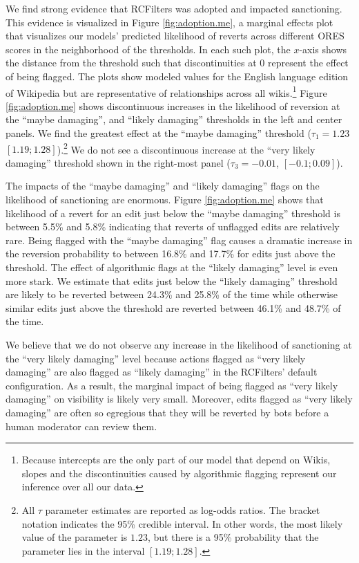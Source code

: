 \documentclass[format=acmsmall, natbib=true,  screen=true]{acmart}
\begin{document}
We find strong evidence that RCFilters was adopted and impacted sanctioning. This evidence is visualized in Figure \ref{fig:adoption.me}, a marginal effects plot that visualizes our models' predicted likelihood of reverts across different ORES scores in the neighborhood of the thresholds. In each such plot, the $x$-axis shows the distance from the threshold such that discontinuities at 0 represent the effect of being flagged. The plots show modeled values for the English language edition of Wikipedia but are representative of relationships across all wikis.\footnote{Because intercepts are the only part of our model that depend on Wikis, slopes and the discontinuities caused by algorithmic flagging represent our inference over all our data.}
Figure \ref{fig:adoption.me} shows discontinuous increases in the likelihood of reversion at the ``maybe damaging'', and ``likely damaging'' thresholds in the left and center panels. 
We find the greatest effect at the ``maybe damaging'' threshold  ($\tau_1 = 1.23$ $[1.19;\allowbreak 1.28]$).\footnote{All $\tau$ parameter estimates are reported as log-odds ratios. The bracket notation indicates the 95\% credible interval.  In other words, the most likely value of the parameter is $1.23$, but there is a 95\% probability that the parameter lies in the interval $[1.19;\allowbreak 1.28]$.}
We do not see a discontinuous increase at the ``very likely damaging'' threshold shown in the right-most panel  ($\tau_3 = -0.01$,  $[-0.1;\allowbreak 0.09]$). 


The impacts of the ``maybe damaging'' and ``likely damaging'' flags on the likelihood of sanctioning are enormous. Figure \ref{fig:adoption.me} shows that likelihood of a revert for an edit just below the ``maybe damaging'' threshold is between 5.5\% and 5.8\% indicating that reverts of unflagged edits are relatively rare. Being flagged 
with the ``maybe damaging'' flag causes a dramatic increase in the reversion probability to between 16.8\% and 17.7\% for edits just above the threshold.  
The effect of algorithmic flags at the ``likely damaging'' level is even more stark. We estimate that edits just below the ``likely damaging'' threshold are  likely to be reverted between 24.3\% and 25.8\% of the time while otherwise similar edits just above the threshold are reverted between 46.1\% and 48.7\% of the time.

We believe that we do not observe any increase in the likelihood of sanctioning at the ``very likely damaging'' level because actions flagged as ``very likely damaging''  are also flagged as ``likely damaging'' in the RCFilters' default configuration.
As a result, the marginal impact of being flagged as ``very likely damaging'' on visibility is likely very small.
Moreover, edits flagged as ``very likely damaging'' are often so egregious that they will be reverted by bots before a human moderator can review them.
\end{document}
